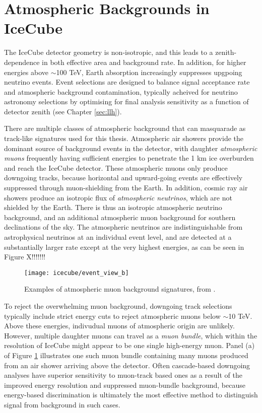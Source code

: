 \section{Atmospheric Backgrounds in IceCube}

The IceCube detector geometry is non-isotropic, and this leads to a zenith-dependence in both effective area and background rate. In addition, for higher energies above $\sim$100 TeV, Earth absorption increasingly suppresses upgpoing neutrino events. Event selections are designed to balance signal acceptance rate and atmospheric background contamination, typically acheived for neutrino astronomy selections by optimising for final analysis sensitivity as a function of detector zenith (see Chapter \ref{sec:llh}). 

There are multiple classes of atmospheric background that can masquarade as track-like signatures used for this thesis. Atmospheric air showers provide the dominant source of background events in the detector, with daughter \emph{atmospheric muons} frequently having sufficient energies to penetrate the 1 km ice overburden and reach the IceCube detector. These atmospheric muons only produce downgoing tracks, because horizontal and upward-going events are effectively suppressed through muon-shielding from the Earth. In addition, cosmic ray air showers produce an isotropic flux of \emph{atmospheric neutrinos}, which are not shielded by the Earth. There is thus an isotropic atmospheric neutrino background, and an additional atmospheric muon background for southern declinations of the sky. The atmospheric neutrinos are indistinguishable from astrophysical neutrinos at an individual event level, and are detected at a substantially larger rate except at the very highest energies, as can be seen in Figure X!!!!!!!

\begin{figure}
	\centering \texttt{[image: icecube/event\_view\_b]}
	\caption{Examples of atmospheric muon background signatures, from \cite{kintscher_thesis}.}
	\label{fig:event_views_bkg}
\end{figure}

To reject the overwhelming muon background, downgoing track selections typically include strict energy cuts to reject atmospheric muons below $\sim$10 TeV. Above these energies, indivudual muons of atmospheric origin are unlikely. However, multiple daughter muons can travel as a \emph{muon bundle}, which within the resolution of IceCube might appear to be one single high-energy muon. Panel (a) of Figure \ref{fig:event_views_bkg} illustrates one such muon bundle containing many muons produced from an air shower arriving above the detector. Often cascade-based downgoing analyses have superior sensitivity to muon-track based ones as a result of the improved energy resolution and suppressed muon-bundle background, because energy-based discrimination is ultimately the most effective method to distinguish signal from background in such cases.

